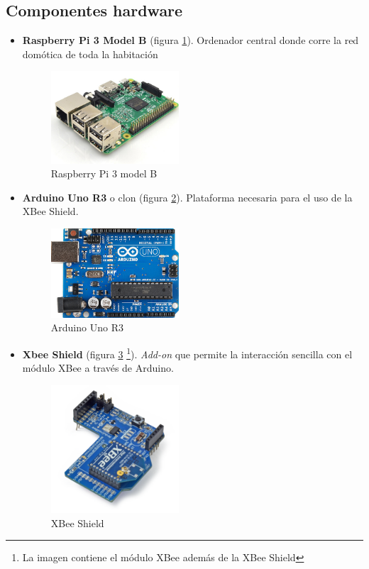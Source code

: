 \subsection{Componentes hardware}
\begin{itemize}
\item \textbf{Raspberry Pi 3 Model B} (figura \ref{fig:RPi3}). Ordenador central donde corre la red domótica de toda la habitación

\begin{figure}[H]
\centering
\includegraphics[width=0.45\textwidth]{figuras/RPi3.png}
\caption{Raspberry Pi 3 model B}
\label{fig:RPi3}
\end{figure}

\item \textbf{Arduino Uno R3} o clon (figura \ref{fig:AUno}). Plataforma necesaria para el uso de la XBee Shield.

\begin{figure}[H]
\centering
\includegraphics[width=0.45\textwidth]{figuras/AUno.png}
\caption{Arduino Uno R3}
\label{fig:AUno}
\end{figure}

\item \textbf{Xbee Shield} (figura \ref{fig:XBeeSh} \footnote{La imagen contiene el módulo XBee además de la XBee Shield}). \textit{Add-on} que permite la interacción sencilla con el módulo XBee a través de Arduino.

\begin{figure}[H]
\centering
\includegraphics[width=0.45\textwidth]{figuras/XBeeShield.png}
\caption{XBee Shield}
\label{fig:XBeeSh}
\end{figure}


\end{itemize}
